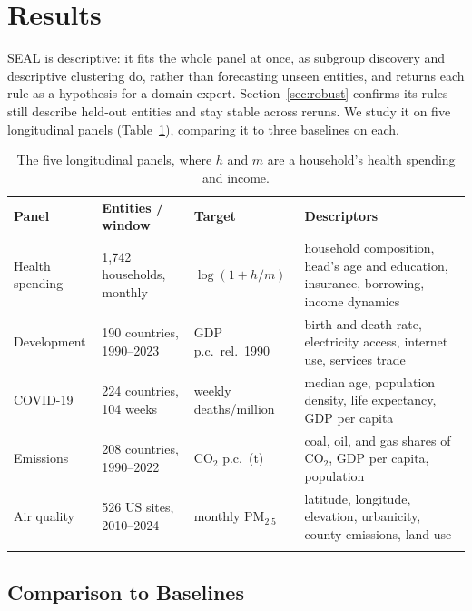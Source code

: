 \documentclass[runningheads]{llncs}
\begin{document}
\section{Results}
\label{sec:results}
\textsc{SEAL} is descriptive: it fits the whole panel at once, as subgroup discovery and descriptive clustering do, rather than forecasting unseen entities, and returns each rule as a hypothesis for a domain expert. Section~\ref{sec:robust} confirms its rules still describe held-out entities and stay stable across reruns. We study it on five longitudinal panels (Table~\ref{tab:datasets}), comparing it to three baselines on each.

\begin{table}[t]
\caption{The five longitudinal panels, where $h$ and $m$ are a household's health spending and income.}
\label{tab:datasets}
\centering
\footnotesize
\begin{tabular}{@{}lllp{4.2cm}@{}}
\hline\noalign{\smallskip}
\textbf{Panel} & \textbf{Entities / window} & \textbf{Target} & \textbf{Descriptors} \\
\noalign{\smallskip}\hline\noalign{\smallskip}
Health spending & 1{,}742 households, monthly & $\log(1{+}h/m)$ & household composition, head's age and education, insurance, borrowing, income dynamics \\
Development & 190 countries, 1990--2023 & GDP p.c.\ rel.\ 1990 & birth and death rate, electricity access, internet use, services trade \\
COVID-19 & 224 countries, 104 weeks & weekly deaths/million & median age, population density, life expectancy, GDP per capita \\
Emissions & 208 countries, 1990--2022 & CO$_2$ p.c.\ (t) & coal, oil, and gas shares of CO$_2$, GDP per capita, population \\
Air quality & 526 US sites, 2010--2024 & monthly PM$_{2.5}$ & latitude, longitude, elevation, urbanicity, county emissions, land use \\
\noalign{\smallskip}\hline
\end{tabular}
\end{table}

\subsection{Comparison to Baselines}
\label{sec:baselines}
\end{document}
